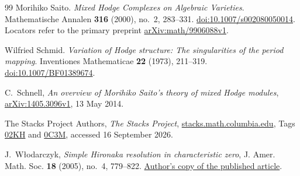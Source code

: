 \begin{thebibliography}{99}
Morihiko Saito.
\newblock \emph{Mixed {Hodge} Complexes on Algebraic Varieties}.
\newblock Mathematische Annalen \textbf{316} (2000), no.~2, 283--331.
\newblock \href{https://doi.org/10.1007/s002080050014}{doi:10.1007/s002080050014}.
\newblock Locators refer to the primary preprint \href{https://arxiv.org/abs/math/9906088v1}{arXiv:math/9906088v1}.

Wilfried Schmid.
\newblock \emph{Variation of {Hodge} structure: The singularities of the period mapping}.
\newblock Inventiones Mathematicae \textbf{22} (1973), 211--319.
\newblock \href{https://doi.org/10.1007/BF01389674}{doi:10.1007/BF01389674}.

C.~Schnell,
\emph{An overview of Morihiko Saito's theory of mixed Hodge modules},
\href{https://arxiv.org/abs/1405.3096v1}{arXiv:1405.3096v1}, 13 May 2014.

The Stacks Project Authors,
\emph{The Stacks Project},
\href{https://stacks.math.columbia.edu}{stacks.math.columbia.edu},
Tags \href{https://stacks.math.columbia.edu/tag/02KH}{02KH} and
\href{https://stacks.math.columbia.edu/tag/0C3M}{0C3M},
accessed 16 September 2026.

J.~W\l{}odarczyk,
\emph{Simple Hironaka resolution in characteristic zero},
J. Amer. Math. Soc. \textbf{18} (2005), no.~4, 779--822.
\href{https://www.math.purdue.edu/~wlodarcz/singularities/Resolution.pdf}{Author's copy of the published article}.

\end{thebibliography}
